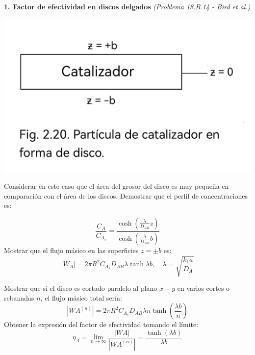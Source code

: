 \textbf{1. Factor de efectividad en discos delgados} \textit{(Problema 18.B.14 - Bird et al.)}
\flushleft
\begin{minipage}{0.4\textwidth} %
    \includegraphics[width=\linewidth]{./Capitulo2/Imagenes/imagen-5.jpg} %
\end{minipage}
\hfill %
\begin{minipage}{0.55\textwidth} %
Considerar en este caso que el área del grosor del disco es muy pequeña en comparación con el área de los discos. Demostrar que el perfil de concentraciones es:
\end{minipage}
\[
 \frac{C_A}{C_{A_s}} = \frac{\cosh \left(\frac{\lambda}{D_{AB}} z\right)}{\cosh \left(\frac{\lambda}{D_{AB}} b\right)}
    \]
Mostrar que el flujo másico en las superficies \( z = \pm b \)  es:
\[
    |W_A| = 2 \pi R^2 C_{A_s} D_{AB} \lambda \tanh \lambda b, \quad \lambda=\sqrt{\frac{k_1a}{D_A}}
\]

Mostrar que si el disco es cortado paralelo al plano \( x-y \) en varios  cortes o rebanadas $n$, el flujo másico total sería:
\[
    |WA^{(n)}| = 2 \pi R^2 C_{A_s} D_{AB} \lambda n \tanh \left(\frac{\lambda b}{n}\right)
    \]
Obtener la expresión del factor de efectividad tomando el límite:
    \[
    \eta_A = \lim_{n \to \infty} \frac{|WA|}{|WA^{(n)}|} = \frac{\tanh (\lambda b)}{\lambda b}
    \]
    











